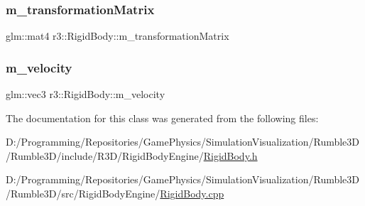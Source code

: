 \subsubsection{\texorpdfstring{m\+\_\+transformation\+Matrix}{m\_transformationMatrix}}
{\footnotesize\ttfamily glm\+::mat4 r3\+::\+Rigid\+Body\+::m\+\_\+transformation\+Matrix\hspace{0.3cm}{\ttfamily [protected]}}

\mbox{\label{classr3_1_1_rigid_body_a2de7cddcf262009fc8261688d1e56c49}} 
\subsubsection{\texorpdfstring{m\+\_\+velocity}{m\_velocity}}
{\footnotesize\ttfamily glm\+::vec3 r3\+::\+Rigid\+Body\+::m\+\_\+velocity\hspace{0.3cm}{\ttfamily [protected]}}



The documentation for this class was generated from the following files\+:\begin{DoxyCompactItemize}
\item 
D\+:/\+Programming/\+Repositories/\+Game\+Physics/\+Simulation\+Visualization/\+Rumble3\+D/\+Rumble3\+D/include/\+R3\+D/\+Rigid\+Body\+Engine/\mbox{\hyperlink{_rigid_body_8h}{Rigid\+Body.\+h}}\item 
D\+:/\+Programming/\+Repositories/\+Game\+Physics/\+Simulation\+Visualization/\+Rumble3\+D/\+Rumble3\+D/src/\+Rigid\+Body\+Engine/\mbox{\hyperlink{_rigid_body_8cpp}{Rigid\+Body.\+cpp}}\end{DoxyCompactItemize}
